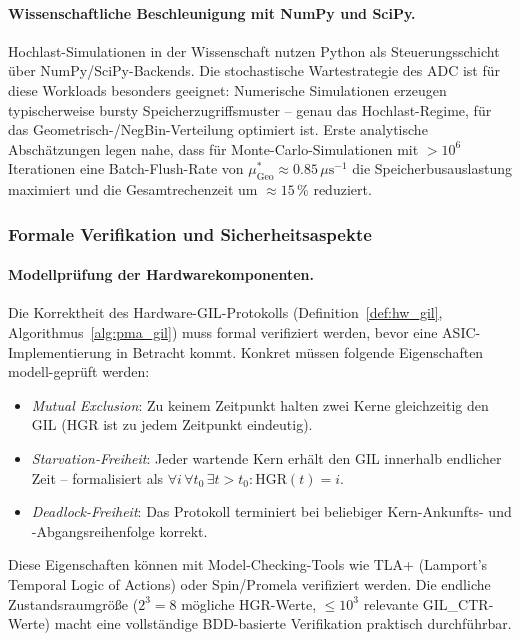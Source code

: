 ﻿\documentclass[a4paper,12pt]{scrreprt}
\theoremstyle{definition}
\begin{document}
	\paragraph{Wissenschaftliche Beschleunigung mit NumPy und SciPy.}
	Hochlast-Simulationen in der Wissenschaft nutzen Python als Steuerungsschicht
	über NumPy/SciPy-Backends. Die stochastische Wartestrategie des ADC ist
	für diese Workloads besonders geeignet: Numerische Simulationen erzeugen
	typischerweise bursty Speicherzugriffsmuster -- genau das Hochlast-Regime,
	für das Geometrisch-/NegBin-Verteilung optimiert ist. Erste analytische Abschätzungen legen nahe, dass für
	Monte-Carlo-Simulationen mit $> 10^6$ Iterationen eine Batch-Flush-Rate von
	$\mu_{\mathrm{Geo}}^* \approx 0.85\,\mu\mathrm{s}^{-1}$ die Speicherbusauslastung
	maximiert und die Gesamtrechenzeit um $\approx 15$\,\% reduziert.

	\subsubsection{Formale Verifikation und Sicherheitsaspekte}

	\paragraph{Modellprüfung der Hardwarekomponenten.}
	Die Korrektheit des Hardware-GIL-Protokolls (Definition~\ref{def:hw_gil},
	Algorithmus~\ref{alg:pma_gil}) muss formal verifiziert werden, bevor eine
	ASIC-Implementierung in Betracht kommt. Konkret müssen folgende Eigenschaften
	modell-geprüft werden:
	\begin{itemize}[noitemsep]
		\item \emph{Mutual Exclusion}: Zu keinem Zeitpunkt halten zwei Kerne
		gleichzeitig den GIL ($\mathrm{HGR}$ ist zu jedem Zeitpunkt eindeutig).
		\item \emph{Starvation-Freiheit}: Jeder wartende Kern erhält den GIL
		innerhalb endlicher Zeit -- formalisiert als
		$\forall i\, \forall t_0 \, \exists t > t_0 : \mathrm{HGR}(t) = i$.
		\item \emph{Deadlock-Freiheit}: Das Protokoll terminiert bei beliebiger
		Kern-Ankunfts- und -Abgangsreihenfolge korrekt.
	\end{itemize}
	Diese Eigenschaften können mit Model-Checking-Tools wie TLA+ (Lamport's
	Temporal Logic of Actions) oder Spin/Promela verifiziert werden. Die
	endliche Zustandsraumgröße ($2^3 = 8$ mögliche HGR-Werte, $\le 10^3$
	relevante GIL\_CTR-Werte) macht eine vollständige BDD-basierte Verifikation
	praktisch durchführbar.
\end{document}
